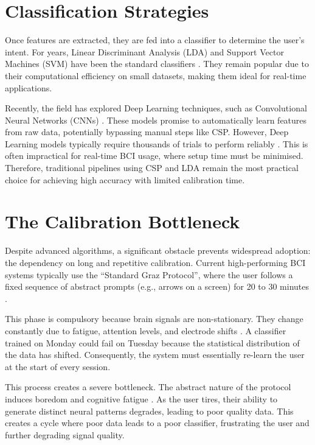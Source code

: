 \documentclass[a4paper, 11pt, openany]{report}
\let\cite\citep
\begin{document}
    \section{Classification Strategies}
    Once features are extracted, they are fed into a classifier to determine the 
    user's intent. For years, Linear Discriminant Analysis (LDA) and Support 
    Vector Machines (SVM) have been the standard classifiers \cite{Lotte2018}. 
    They remain popular due to their computational efficiency on small datasets, 
    making them ideal for real-time applications.

    Recently, the field has explored Deep Learning techniques, such as 
    Convolutional Neural Networks (CNNs) \cite{Raza2019}. These models promise 
    to automatically learn features from raw data, potentially bypassing manual 
    steps like CSP. However, Deep Learning models typically require thousands 
    of trials to perform reliably \cite{Roy2019}. This is often impractical 
    for real-time BCI usage, where setup time must be minimised. Therefore, 
    traditional pipelines using CSP and LDA remain the most practical choice 
    for achieving high accuracy with limited calibration time.


    \section{The Calibration Bottleneck}
    Despite advanced algorithms, a significant obstacle prevents widespread 
    adoption: the dependency on long and repetitive calibration. Current 
    high-performing BCI systems typically use the ``Standard Graz Protocol'', 
    where the user follows a fixed sequence of abstract prompts (e.g., arrows 
    on a screen) for 20 to 30 minutes \cite{Pfurtscheller2001}.

    This phase is compulsory because brain signals are non-stationary. They 
    change constantly due to fatigue, attention levels, and electrode shifts \cite{Sugiyama2008}. 
    A classifier trained on Monday could fail on Tuesday because the statistical 
    distribution of the data has shifted. Consequently, the system must 
    essentially re-learn the user at the start of every session.

    This process creates a severe bottleneck. The abstract nature of the protocol 
    induces boredom and cognitive fatigue \cite{Xu2024}. As the user tires, 
    their ability to generate distinct neural patterns degrades, leading to 
    poor quality data. This creates a cycle where poor data leads to a poor 
    classifier, frustrating the user and further degrading signal quality.
\end{document}
